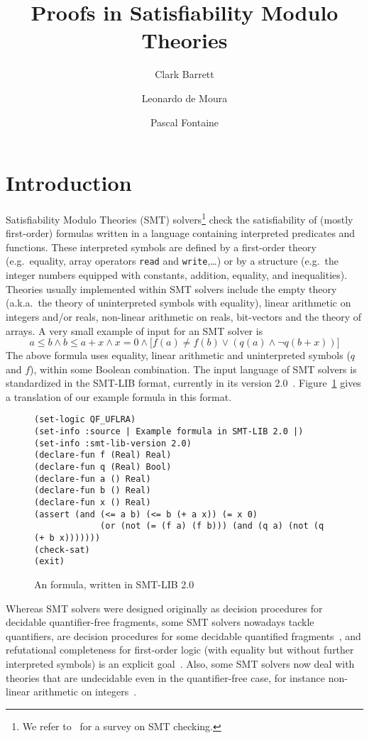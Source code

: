 \documentclass{llncs}
\title{ Proofs in Satisfiability Modulo Theories }
\author{
  Clark Barrett \inst{1}
  \and 
  Leonardo de Moura \inst{2}
  \and
  Pascal Fontaine \inst{3}
}
\institute{
  New York University\\
  \email{barrett@cs.nyu.edu}
  \and 
  Microsoft Research \\
  \email{leonardo@microsoft.com}
  \and
  University of Lorraine and INRIA\\
  \email{pascal.fontaine@inria.fr}
}
\begin{document}
\maketitle

\section{Introduction}

Satisfiability Modulo Theories (SMT) solvers\footnote{We refer to~\cite{} for a
  survey on SMT checking.} check the satisfiability of (mostly first-order)
formulas written in a language containing interpreted predicates and functions.
These interpreted symbols are defined by a first-order theory (e.g.\ equality,
array operators {\tt read} and {\tt write},\dots) or by a structure (e.g.\ the
integer numbers equipped with constants, addition, equality, and inequalities).
Theories usually implemented within SMT solvers include the empty theory
(a.k.a.\ the theory of uninterpreted symbols with equality), linear arithmetic
on integers and/or reals, non-linear arithmetic on reals, bit-vectors and the
theory of arrays.  A very small example of input for an SMT solver is
\begin{displaymath}
a \leq b \wedge b \leq a + x \wedge x = 0 \wedge
 \big[ f(a) \neq f(b) \vee (q(a) \wedge \neg q(b + x)) \big]
\end{displaymath}
The above formula uses equality, linear arithmetic and uninterpreted symbols
($q$ and $f$), within some Boolean combination.  The input language of SMT
solvers is standardized in the SMT-LIB format, currently in its version
2.0~\cite{}.  Figure~\ref{fig:smtlib} gives a translation of our example formula
in this format.

\begin{figure}
{\footnotesize
\begin{verbatim}
(set-logic QF_UFLRA)
(set-info :source | Example formula in SMT-LIB 2.0 |)
(set-info :smt-lib-version 2.0)
(declare-fun f (Real) Real)
(declare-fun q (Real) Bool)
(declare-fun a () Real)
(declare-fun b () Real)
(declare-fun x () Real)
(assert (and (<= a b) (<= b (+ a x)) (= x 0)
             (or (not (= (f a) (f b))) (and (q a) (not (q (+ b x)))))))
(check-sat)
(exit)
\end{verbatim}
}
\caption{\label{fig:smtlib} An formula, written in SMT-LIB 2.0}
\end{figure}

Whereas SMT solvers were designed originally as decision procedures for
decidable quantifier-free fragments, some SMT solvers nowadays tackle
quantifiers, are decision procedures for some decidable quantified
fragments~\cite{}, and refutational completeness for first-order logic (with
equality but without further interpreted symbols) is an explicit goal~\cite{}.
Also, some SMT solvers now deal with theories that are undecidable even in the
quantifier-free case, for instance non-linear arithmetic on integers~\cite{}.
\end{document}
